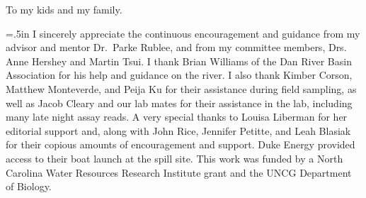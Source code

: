 \documentclass[ms, hidelinks]{uncgdissertationexp3}
\theoremstyle{plain}
\theoremstyle{definition}
\theoremstyle{remark}
\begin{document}
\begin{dedication}
  To my kids and my family.
\end{dedication}

\makeapprovalpage

\begin{acknowledgments}
  \raggedright\parindent=.5in
  I sincerely appreciate the continuous encouragement and guidance from my advisor and mentor Dr.~Parke Rublee, and from my committee members, Drs. Anne Hershey and Martin Tsui. I thank Brian Williams of the Dan River Basin Association for his help and guidance on the river. I also thank Kimber Corson, Matthew Monteverde, and Peija Ku for their assistance during field sampling, as well as Jacob Cleary and our lab mates for their assistance in the lab, including many late night assay reads. A very special thanks to Louisa Liberman for her editorial support and, along with John Rice, Jennifer Petitte, and Leah Blasiak for their copious amounts of encouragement and support. Duke Energy provided access to their boat launch at the spill site. This work was funded by a North Carolina Water Resources Research Institute grant and the UNCG Department of Biology.

\end{acknowledgments}

\end{document}
